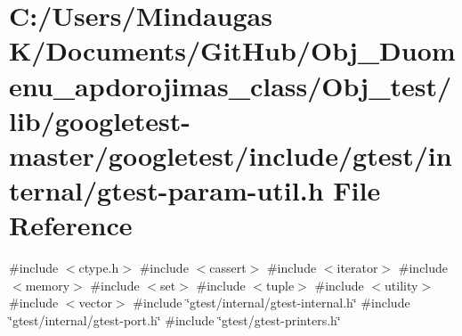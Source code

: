 \hypertarget{_obj__test_2lib_2googletest-master_2googletest_2include_2gtest_2internal_2gtest-param-util_8h}{}\section{C\+:/\+Users/\+Mindaugas K/\+Documents/\+Git\+Hub/\+Obj\+\_\+\+Duomenu\+\_\+apdorojimas\+\_\+class/\+Obj\+\_\+test/lib/googletest-\/master/googletest/include/gtest/internal/gtest-\/param-\/util.h File Reference}
\label{_obj__test_2lib_2googletest-master_2googletest_2include_2gtest_2internal_2gtest-param-util_8h}
{\ttfamily \#include $<$ctype.\+h$>$}\newline
{\ttfamily \#include $<$cassert$>$}\newline
{\ttfamily \#include $<$iterator$>$}\newline
{\ttfamily \#include $<$memory$>$}\newline
{\ttfamily \#include $<$set$>$}\newline
{\ttfamily \#include $<$tuple$>$}\newline
{\ttfamily \#include $<$utility$>$}\newline
{\ttfamily \#include $<$vector$>$}\newline
{\ttfamily \#include \char`\"{}gtest/internal/gtest-\/internal.\+h\char`\"{}}\newline
{\ttfamily \#include \char`\"{}gtest/internal/gtest-\/port.\+h\char`\"{}}\newline
{\ttfamily \#include \char`\"{}gtest/gtest-\/printers.\+h\char`\"{}}\newline
